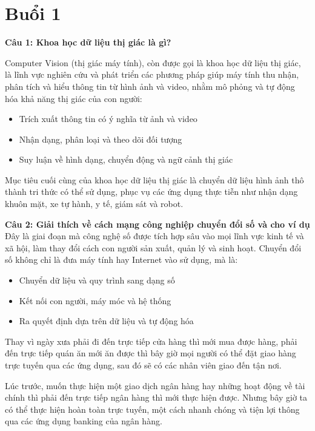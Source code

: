 \section{Buổi 1}

\textbf{Câu 1: Khoa học dữ liệu thị giác là gì?}

Computer Vision (thị giác máy tính), còn được gọi là khoa học dữ liệu thị giác, là lĩnh vực nghiên cứu và phát triển các phương pháp giúp máy tính thu nhận, phân tích và hiểu thông tin từ hình ảnh và video, nhằm mô phỏng và tự động hóa khả năng thị giác của con người:

\begin{itemize}
	\item Trích xuất thông tin có ý nghĩa từ ảnh và video
	
	\item Nhận dạng, phân loại và theo dõi đối tượng
	
	\item Suy luận về hình dạng, chuyển động và ngữ cảnh thị giác
\end{itemize}

Mục tiêu cuối cùng của khoa học dữ liệu thị giác là chuyển dữ liệu hình ảnh thô thành tri thức có thể sử dụng, phục vụ các ứng dụng thực tiễn như nhận dạng khuôn mặt, xe tự hành, y tế, giám sát và robot.

\textbf{Câu 2: Giải thích về cách mạng công nghiệp chuyển đổi số và cho ví dụ}\\
Đây là giai đoạn mà công nghệ số được tích hợp sâu vào mọi lĩnh vực kinh tế và xã hội, làm thay đổi cách con người sản xuất, quản lý và sinh hoạt. Chuyển đổi số không chỉ là đưa máy tính hay Internet vào sử dụng, mà là:

\begin{itemize}
	\item Chuyển dữ liệu và quy trình sang dạng số
	
	\item Kết nối con người, máy móc và hệ thống
	
	\item Ra quyết định dựa trên dữ liệu và tự động hóa
\end{itemize}

Thay vì ngày xưa phải đi đến trực tiếp cửa hàng thì mới mua được hàng, phải đến trực tiếp quán ăn mới ăn được thì bây giờ mọi người có thể đặt giao hàng trực tuyến qua các ứng dụng, sau đó sẽ có các nhân viên giao đến tận nơi.

Lúc trước, muốn thực hiện một giao dịch ngân hàng hay những hoạt động về tài chính thì phải đến trực tiếp ngân hàng thì mới thực hiện được. Nhưng bây giờ ta có thể thực hiện hoàn toàn trực tuyến, một cách nhanh chóng và tiện lợi thông qua các ứng dụng banking của ngân hàng.


